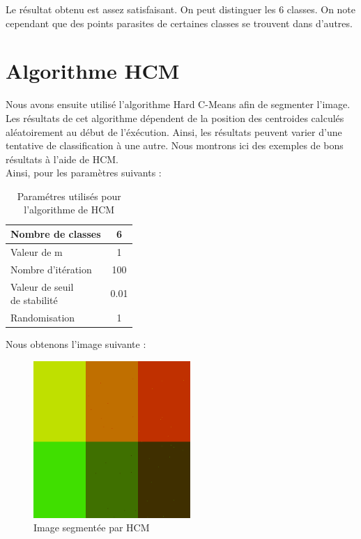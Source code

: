 \documentclass[a4paper,11pt]{article}
\begin{document}
Le résultat obtenu est assez satisfaisant. On peut distinguer les 6 classes. On note cependant que des points parasites de certaines classes se trouvent dans d'autres.

\section{Algorithme HCM}
Nous avons ensuite utilisé l'algorithme Hard C-Means afin de segmenter l'image. Les résultats de cet algorithme dépendent de la position des centroides calculés aléatoirement au début de l'éxécution. Ainsi, les résultats peuvent varier d'une tentative de classification à une autre. Nous montrons ici des exemples de bons résultats à l'aide de HCM. \\

Ainsi, pour les paramètres suivants : 

\begin{table}[H]
  \begin{center}
    \begin{tabular}{|l|c|}
      \hline
      Nombre de classes & 6 \\
      \hline
      Valeur de m & 1 \\
      \hline
      Nombre d'itération & 100 \\
      \hline
      \shortstack{ Valeur de seuil \\ de stabilité }  & 0.01 \\
      \hline
      Randomisation & 1 \\
      \hline
    \end{tabular}
    \caption{Paramétres utilisés pour l'algorithme de HCM}
  \end{center}
\end{table}

Nous obtenons l'image suivante :

\begin{figure}[H]
\begin{center}
\includegraphics[width=225px]{../img/HCM.png}
\end{center}
\caption{Image segmentée par HCM}
\end{figure}
\end{document}
